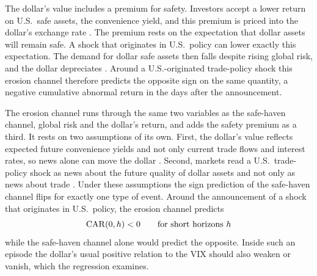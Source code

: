 
The dollar's value includes a premium for safety. Investors accept a lower return on U.S.\ safe assets, the convenience yield, and this premium is priced into the dollar's exchange rate \parencite{jiang_krishnamurthy_lustig_2021}. The premium rests on the expectation that dollar assets will remain safe. A shock that originates in U.S.\ policy can lower exactly this expectation. The demand for dollar safe assets then falls despite rising global risk, and the dollar depreciates \parencite{hassan_mertens_wang_zhang_2025}. Around a U.S.-originated trade-policy shock this erosion channel therefore predicts the opposite sign on the same quantity, a negative cumulative abnormal return in the days after the announcement.

The erosion channel runs through the same two variables as the safe-haven channel, global risk and the dollar's return, and adds the safety premium as a third. It rests on two assumptions of its own. First, the dollar's value reflects expected future convenience yields and not only current trade flows and interest rates, so news alone can move the dollar \parencite{jiang_krishnamurthy_lustig_2021}. Second, markets read a U.S.\ trade-policy shock as news about the future quality of dollar assets and not only as news about trade \parencite{hassan_mertens_wang_zhang_2025}. Under these assumptions the sign prediction of the safe-haven channel flips for exactly one type of event. Around the announcement of a shock that originates in U.S.\ policy, the erosion channel predicts
\begin{equation*}
  \mathrm{CAR}(0,h) < 0 \qquad \text{for short horizons } h
\end{equation*}
while the safe-haven channel alone would predict the opposite. Inside such an episode the dollar's usual positive relation to the VIX should also weaken or vanish, which the regression examines.

